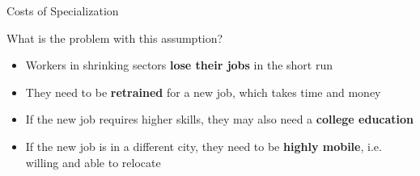 \documentclass[9pt,english,aspectratio=169]{beamer}
\begin{document}
\begin{frame}{Costs of Specialization}

  \begin{questionbox}
    What is the problem with this assumption?
  \end{questionbox}

  \vspace{0.8em}
  \begin{answerbox}
      \begin{itemize}
      \item Workers in shrinking sectors \textbf{lose their jobs} in the short run
      \item They need to be \textbf{retrained} for a new job, which takes time and money
      \item If the new job requires higher skills, they may also need a \textbf{college education}
      \item If the new job is in a different city, they need to be \textbf{highly mobile}, i.e. willing and able to relocate
    \end{itemize}
  \end{answerbox}

\end{frame}
\end{document}
